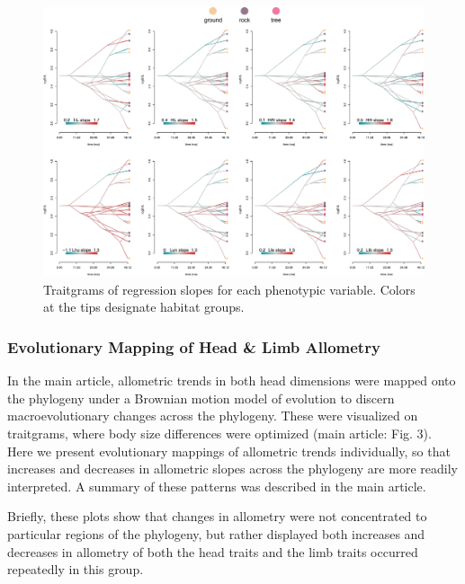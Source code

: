 \documentclass[
  11pt,
]{article}
\begin{document}
\begin{figure}[H]

{\centering \includegraphics[width=0.9\linewidth]{Figs/phenograms_variables} 

}

\caption{Traitgrams of regression slopes for each phenotypic variable. Colors at the tips designate habitat groups.}\label{fig:unnamed-chunk-4}
\end{figure}

\newpage

\hypertarget{evolutionary-mapping-of-head-limb-allometry}{%
\subsubsection{Evolutionary Mapping of Head \& Limb
Allometry}\label{evolutionary-mapping-of-head-limb-allometry}}

In the main article, allometric trends in both head dimensions were
mapped onto the phylogeny under a Brownian motion model of evolution to
discern macroevolutionary changes across the phylogeny. These were
visualized on traitgrams, where body size differences were optimized
(main article: Fig. 3). Here we present evolutionary mappings of
allometric trends individually, so that increases and decreases in
allometric slopes across the phylogeny are more readily interpreted. A
summary of these patterns was described in the main article.

Briefly, these plots show that changes in allometry were not
concentrated to particular regions of the phylogeny, but rather
displayed both increases and decreases in allometry of both the head
traits and the limb traits occurred repeatedly in this group.
\end{document}
